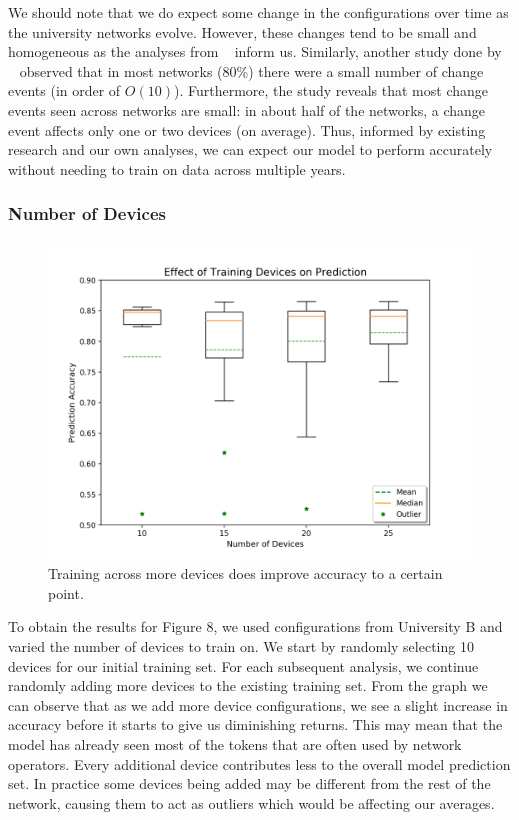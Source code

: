 We should note that we do expect some change in the configurations over time as the university networks evolve. However, these changes tend to be small and homogeneous as the analyses from ~\cite{Kim} inform us. Similarly, another study done by ~\cite{Gember} observed that in most networks (80\%) there were a small number of change events (in order of $O(10)$). Furthermore, the study reveals that most change events seen across networks are small: in about half of the networks, a change event affects only one or two devices (on average). Thus, informed by existing research and our own analyses, we can expect our model to perform accurately without needing to train on data across multiple years.

\subsubsection{Number of Devices}
\begin{figure}[H]
	\centering
	\includegraphics[width=\textwidth]{device_analysis.png}
	\caption{Training across more devices does improve accuracy to a certain point.}
\end{figure}

To obtain the results for Figure 8, we used configurations from University B and varied the number of devices to train on. We start by randomly selecting 10 devices for our initial training set. For each subsequent analysis, we continue randomly adding more devices to the existing training set. From the graph we can observe that as we add more device configurations, we see a slight increase in accuracy before it starts to give us diminishing returns. This may mean that the model has already seen most of the tokens that are often used by network operators. Every additional device contributes less to the overall model prediction set. In practice some devices being added may be different from the rest of the network, causing them to act as outliers which would be affecting our averages.

